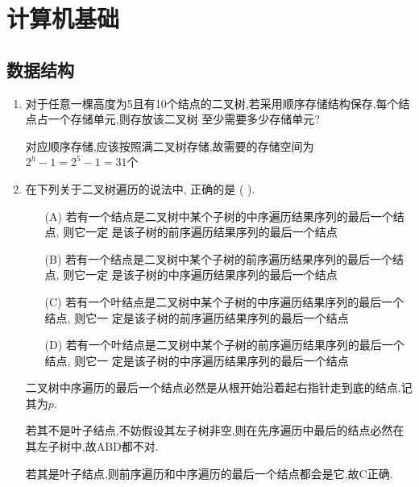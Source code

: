\documentclass[12pt, a4paper, oneside, UTF8]{ctexbook}
\begin{document}
% 
\else
\fi
\chapter{计算机基础}
\section{数据结构}
\begin{enumerate}
    \item 对于任意一棵高度为5且有10个结点的二叉树,若采用顺序存储结构保存,每个结点占一个存储单元,则存放该二叉树
    至少需要多少存储单元? 
    \begin{solution}
    对应顺序存储,应该按照满二叉树存储,故需要的存储空间为$2^h-1=2^5-1=31$个
    \end{solution}
    \item 在下列关于二叉树遍历的说法中, 正确的是 (   ).
    \begin{enumerate}
        \item[(A)]若有一个结点是二叉树中某个子树的中序遍历结果序列的最后一个结点, 则它一定
        是该子树的前序遍历结果序列的最后一个结点
        \item[(B)] 若有一个结点是二叉树中某个子树的前序遍历结果序列的最后一个结点, 则它一定
        是该子树的中序遍历结果序列的最后一个结点
        \item[(C)]若有一个叶结点是二叉树中某个子树的中序遍历结果序列的最后一个结点, 则它一
        定是该子树的前序遍历结果序列的最后一个结点
        \item[(D)] 若有一个叶结点是二叉树中某个子树的前序遍历结果序列的最后一个结点, 则它一
        定是该子树的中序遍历结果序列的最后一个结点
    \end{enumerate}
    \begin{solution}
        二叉树中序遍历的最后一个结点必然是从根开始沿着起右指针走到底的结点,记其为$p$. 
        
        若其不是叶子结点,不妨假设其左子树非空,则在先序遍历中最后的结点必然在其左子树中,故ABD都不对.  

        若其是叶子结点,则前序遍历和中序遍历的最后一个结点都会是它,故C正确.
    \end{solution}
\end{enumerate}
\end{document}
